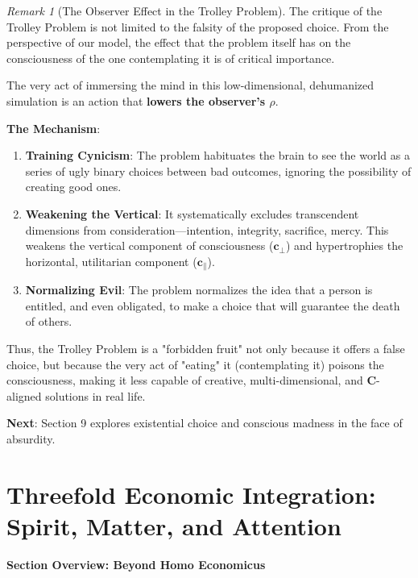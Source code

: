 \documentclass[11pt,a4paper]{article}
\theoremstyle{definition}
\theoremstyle{remark}
\newtheorem{remark}{Remark}[section]
\newcommand{\cc}{\mathbf{c}}
\begin{document}
\begin{small}
\begin{enumerate}
\begin{mdframed}[backgroundcolor=green!10,linewidth=2pt,linecolor=green!70!black]
\begin{remark}[The Observer Effect in the Trolley Problem]
The critique of the Trolley Problem is not limited to the falsity of the proposed choice. From the perspective of our model, the effect that the problem itself has on the consciousness of the one contemplating it is of critical importance.

The very act of immersing the mind in this low-dimensional, dehumanized simulation is an action that \textbf{lowers the observer's $\rho$}.

\textbf{The Mechanism}:
\begin{enumerate}
    \item \textbf{Training Cynicism}: The problem habituates the brain to see the world as a series of ugly binary choices between bad outcomes, ignoring the possibility of creating good ones.
    \item \textbf{Weakening the Vertical}: It systematically excludes transcendent dimensions from consideration—intention, integrity, sacrifice, mercy. This weakens the vertical component of consciousness ($\cc_\perp$) and hypertrophies the horizontal, utilitarian component ($\cc_\parallel$).
    \item \textbf{Normalizing Evil}: The problem normalizes the idea that a person is entitled, and even obligated, to make a choice that will guarantee the death of others.
\end{enumerate}
Thus, the Trolley Problem is a "forbidden fruit" not only because it offers a false choice, but because the very act of "eating" it (contemplating it) poisons the consciousness, making it less capable of creative, multi-dimensional, and $\mathbf{C}$-aligned solutions in real life.
\end{remark}

\textbf{Next}: Section 9 explores existential choice and conscious madness in the face of absurdity.
\end{mdframed}


\section{Threefold Economic Integration: Spirit, Matter, and Attention}

\begin{mdframed}[backgroundcolor=cyan!5,linewidth=2pt]
\textbf{Section Overview: Beyond Homo Economicus}
\end{mdframed}


\end{enumerate}
\end{small}
\end{document}
